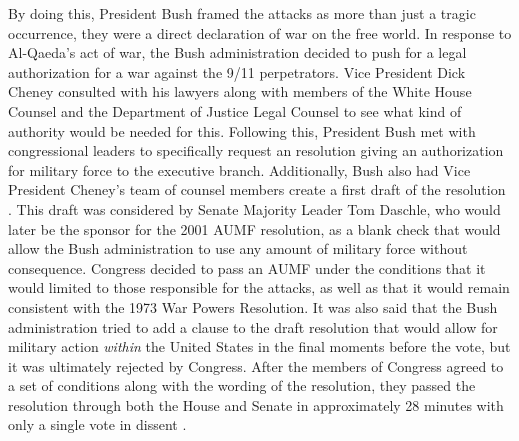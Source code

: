 \documentclass[12pt]{article}
\begin{document}
\noindent
By doing this, President Bush framed the attacks as more than just a tragic occurrence, they were a direct declaration of war on the free world.
In response to Al-Qaeda's act of war, the Bush administration decided to push for a legal authorization for a war against the 9/11 perpetrators.
Vice President Dick Cheney consulted with his lawyers along with members of the White House Counsel and the Department of Justice Legal Counsel to see what kind of authority would be needed for this.
Following this, President Bush met with congressional leaders to specifically request an resolution giving an authorization for military force to the executive branch.
Additionally, Bush also had Vice President Cheney's team of counsel members create a first draft of the resolution \autocite[176]{murray2015}.
This draft was considered by Senate Majority Leader Tom Daschle, who would later be the sponsor for the 2001 AUMF resolution, as a blank check that would allow the Bush administration to use any amount of military force without consequence.
Congress decided to pass an AUMF under the conditions that it would limited to those responsible for the attacks, as well as that it would remain consistent with the 1973 War Powers Resolution.
It was also said that the Bush administration tried to add a clause to the draft resolution that would allow for military action \emph{within} the United States in the final moments before the vote, but it was ultimately rejected by Congress.
After the members of Congress agreed to a set of conditions along with the wording of the resolution, they passed the resolution through both the House and Senate in approximately 28 minutes with only a single vote in dissent \autocite[177]{murray2015}.
\end{document}
